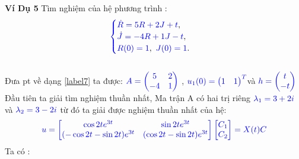 \documentclass[a4paper]{article}
\begin{document}
 \textbf{Ví Dụ 5}
Tìm nghiệm của hệ phương trình :
 \begin{align}
	    \textcolor{blue}{
	    \begin{cases}
            \dot R = 5R +2J + t \textcolor{black}{,}\\
            \dot J = -4R + 1J -t \textcolor{black}{,}\\
            R(0) = 1\textcolor{black}{,} \enskip J(0) = 1 \textcolor{black}{.}
        \end{cases}
        }
        \label{label9}
	\end{align}\\
 Đưa pt về dạng \eqref{label7} ta được: 
 \notag
 $\textcolor{blue}{A = \begin{pmatrix} 5& 2\\ -4 & 1 \end{pmatrix}}$ , \enskip $\textcolor{blue}{u_1(0) = \begin{pmatrix} 1 & 1 \end{pmatrix}\sp{T}}$\enskip và   $\textcolor{blue}{h =\begin{pmatrix} t \\ -t \end{pmatrix}}$\\
Đầu tiên ta giải tìm nghiệm thuần nhất, Ma trận A có hai trị riêng $\textcolor{blue}{\lambda_1=3 + 2i}$ và $\textcolor{blue}{\lambda_2=3-2i }$ từ đó  ta giải được nghiệm thuần nhất của hệ:\\
\begin{align}
\notag
\textcolor{blue}{u= \begin{bmatrix} \cos{2t}e^{3t} & \sin{2t}e^{3t}\\ (-\cos{2t}-\sin{2t)}e^{3t} & (\cos{2t}-\sin{2t})e^{3t} \end{bmatrix} \begin{bmatrix} C_1 \\ C_2 \end{bmatrix}=X(t)C}
\end{align}
Ta có :  
\end{document}
